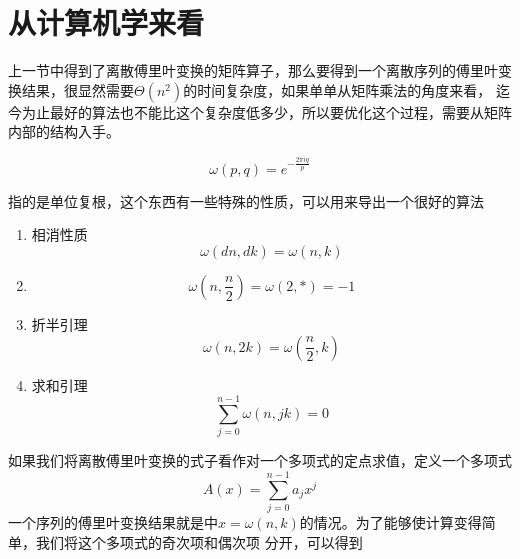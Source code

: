     \section{从计算机学来看}
        上一节中得到了离散傅里叶变换的矩阵算子，那么要得到一个离散序列的傅里叶变换结果，很显然需要$\Theta(n^2)$的时间复杂度，如果单单从矩阵乘法的角度来看，%
        迄今为止最好的算法也不能比这个复杂度低多少，所以要优化这个过程，需要从矩阵内部的结构入手。
        \begin{definition}
            \begin{equation}
                \omega(p, q) = e^{-\frac{2\pi i q}{p}}
                \label{eq: 4.4}
            \end{equation}
        \end{definition}
        指的是单位复根，这个东西有一些特殊的性质，可以用来导出一个很好的算法
        \begin{enumerate}
            \item{相消性质}
            \begin{equation}
                \omega(dn, dk) = \omega(n, k)
                \label{eq: 4.5}
            \end{equation}
            \item
            \begin{equation}
                \omega(n, \frac n 2) = \omega(2, *) = -1
                \label{eq: 4.6}
            \end{equation}
            \item{折半引理}
            \begin{equation}
                \omega(n, 2k) = \omega(\frac n 2, k)
                \label{eq: 4.7}
            \end{equation}
            \item{求和引理}
            \begin{equation}
                \sum_{j = 0}^{n - 1} \omega(n, jk) = 0
                \label{eq: 4.8}
            \end{equation}
        \end{enumerate}
        如果我们将离散傅里叶变换的式子看作对一个多项式的定点求值，定义一个多项式
        \begin{equation}
            A(x) = \sum_{j = 0}^{n - 1} a_jx^j
            \label{eq: 4.9}
        \end{equation}
        一个序列的傅里叶变换结果就是中$x = \omega(n, k)$的情况。为了能够使计算变得简单，我们将这个多项式的奇次项和偶次项%
        分开，可以得到
